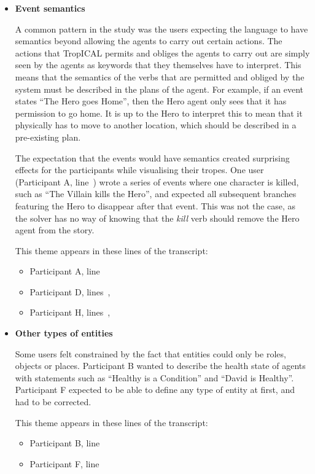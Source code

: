 \documentclass[11pt]{report}
\begin{document}
\begin{itemize}
\item \textbf{Event semantics}

A common pattern in the study was the users expecting the language to have
semantics beyond allowing the agents to carry out certain actions. The actions
that TropICAL permits and obliges the agents to carry out are simply seen by the
agents as keywords that they themselves have to interpret. This means that the
semantics of the verbs that are permitted and obliged by the system must be
described in the plans of the agent. For example, if an event states ``The Hero
goes Home'', then the Hero agent only sees that it has permission to go home. It
is up to the Hero to interpret this to mean that it physically has to move to
another location, which should be described in a pre-existing plan.

The expectation that the events would have semantics created surprising effects
for the participants while visualising their tropes. One user (Participant A,
line~) wrote a series of events where one character is killed, such as ``The Villain kills the Hero'',
and expected all subsequent branches featuring the Hero to disappear after that
event. This was not the case, as the solver has no way of knowing that the
\emph{kill} verb should remove the Hero agent from the story.

This theme appears in these lines of the transcript:

\begin{itemize}
\item Participant A, line~
\item Participant D, lines~,~
\item Participant H, lines~,~
\end{itemize}

\item \textbf{Other types of entities}

Some users felt constrained by the fact that entities could only be roles,
objects or places. Participant B wanted to describe the health state of agents
with statements such as ``Healthy is a Condition'' and ``David is Healthy''.
Participant F expected to be able to define any type of entity at first, and had
to be corrected.

This theme appears in these lines of the transcript:

\begin{itemize}
\item Participant B, line~
\item Participant F, line~
\end{itemize}


\end{itemize}
\end{document}
